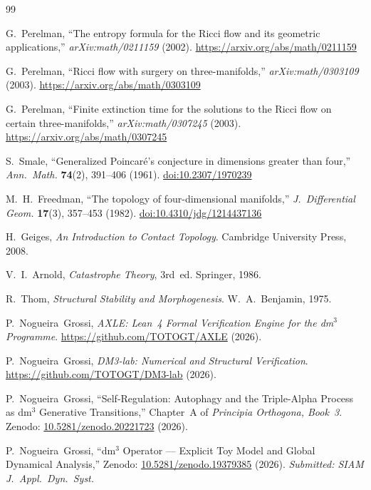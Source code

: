 \documentclass[14pt,a4paper]{extarticle}
\begin{document}
\begin{thebibliography}{99}
\sloppy

G.~Perelman,
``The entropy formula for the Ricci flow and its geometric applications,''
\textit{arXiv:math/0211159} (2002).
\url{https://arxiv.org/abs/math/0211159}

G.~Perelman,
``Ricci flow with surgery on three-manifolds,''
\textit{arXiv:math/0303109} (2003).
\url{https://arxiv.org/abs/math/0303109}

G.~Perelman,
``Finite extinction time for the solutions to the Ricci flow on
certain three-manifolds,''
\textit{arXiv:math/0307245} (2003).
\url{https://arxiv.org/abs/math/0307245}

S.~Smale,
``Generalized Poincar\'e's conjecture in dimensions greater than four,''
\textit{Ann.\ Math.} \textbf{74}(2), 391--406 (1961).
\href{https://doi.org/10.2307/1970239}{doi:10.2307/1970239}

M.~H.~Freedman,
``The topology of four-dimensional manifolds,''
\textit{J.\ Differential Geom.} \textbf{17}(3), 357--453 (1982).
\href{https://doi.org/10.4310/jdg/1214437136}{doi:10.4310/jdg/1214437136}

H.~Geiges,
\textit{An Introduction to Contact Topology}.
Cambridge University Press, 2008.

V.~I.~Arnold,
\textit{Catastrophe Theory}, 3rd~ed. Springer, 1986.

R.~Thom,
\textit{Structural Stability and Morphogenesis}.
W.~A.~Benjamin, 1975.

P.~Nogueira~Grossi,
\textit{AXLE: Lean~4 Formal Verification Engine for the dm$^3$ Programme}.
\url{https://github.com/TOTOGT/AXLE} (2026).

P.~Nogueira~Grossi,
\textit{DM3-lab: Numerical and Structural Verification}.
\url{https://github.com/TOTOGT/DM3-lab} (2026).

P.~Nogueira~Grossi,
``Self-Regulation: Autophagy and the Triple-Alpha Process as
dm$^3$ Generative Transitions,''
Chapter~A of \textit{Principia Orthogona, Book~3}.
Zenodo:
\href{https://doi.org/10.5281/zenodo.20221723}{10.5281/zenodo.20221723}
(2026).

P.~Nogueira~Grossi,
``dm$^3$ Operator --- Explicit Toy Model and Global Dynamical Analysis,''
Zenodo:
\href{https://doi.org/10.5281/zenodo.19379385}{10.5281/zenodo.19379385}
(2026). \textit{Submitted: SIAM J.\ Appl.\ Dyn.\ Syst.}



\end{thebibliography}
\end{document}
